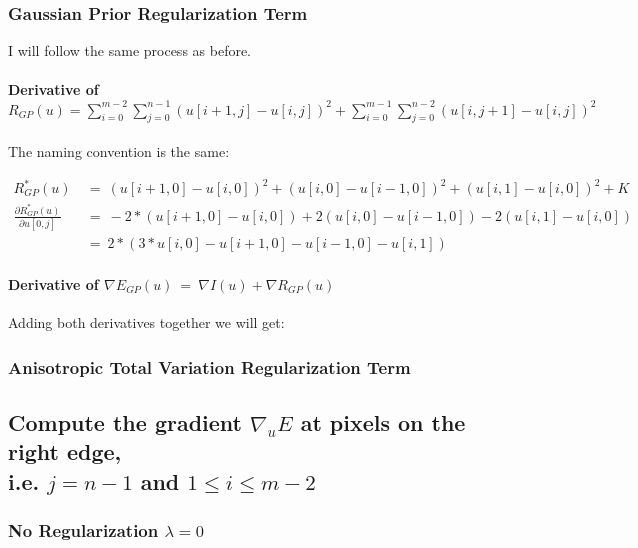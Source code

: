 \documentclass{report}
\begin{document}
			\subsubsection{Gaussian Prior Regularization Term}
			\startsubsection
				I will follow the same process as before.
				\vspace{-0.4cm} \paragraph{Derivative of $R_{GP}(u) = \sum_{i=0}^{m-2} \sum_{j=0}^{n-1} ( u[i+1,j] - u[i,j] )^2 + \sum_{i=0}^{m-1} \sum_{j=0}^{n-2} ( u[i,j+1] - u[i,j] )^2$}
				\startsubsection
					\vspace{0.2cm} The naming convention is the same:
				\closesection
				\begin{adjustwidth}{-4em}{}
					\vspace{-0.5cm}
					\begin{align*}
						R_{GP}^*(u) \ & = \ (u[i+1,0] - u[i,0])^2 + (u[i,0] - u[i-1,0])^2 + (u[i,1] - u[i,0])^2 + K \\
						\frac{\partial R_{GP}^*(u)}{\partial u[0,j]} \ & = \ -2 * (u[i+1,0] - u[i,0]) + 2 (u[i,0] - u[i-1,0]) - 2 (u[i,1] - u[i,0]) \\
						& = \ 2 * (3 * u[i,0] - u[i+1,0] - u[i-1,0] - u[i,1])
					\end{align*}
				\end{adjustwidth}
				\vspace{-0.4cm} \paragraph{Derivative of $\nabla E_{GP}(u) \ = \ \nabla I(u) + \nabla R_{GP}(u)$}
				\startsubsection
					Adding both derivatives together we will get:
				\closesection
			\closesection
			\subsubsection{Anisotropic Total Variation Regularization Term}
			\startsubsection
			\closesection
		\closesection
		\subsection{Compute the gradient $\nabla_u E$ at pixels on the right edge, \\ i.e. $j = n - 1$ and $1 \leq i \leq m-2$}
		\startsubsection
			\subsubsection{No Regularization $\lambda = 0$}
			\startsubsection
			\closesection
\end{document}
